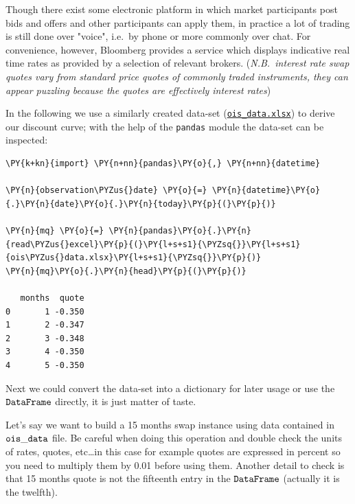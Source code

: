 Though there exist some electronic platform in which market participants post bids and offers and other participants can apply them, in practice a lot of trading is still done over "voice", i.e.~by phone or more
commonly over chat. For convenience, however, Bloomberg provides a service which displays indicative real time rates as provided by a selection of relevant brokers. (\emph{N.B.~interest rate swap quotes vary from standard price quotes of commonly traded instruments, they can appear puzzling because the quotes are effectively interest rates})

In the following we use a similarly created data-set (\href{https://drive.google.com/file/d/1LCEDmheKqwPXFpJ25hFz32QI5im2UJO1/view?usp=sharing}{\texttt{ois\_data.xlsx}}) to derive our discount curve; with the help of the \texttt{pandas} module the data-set can be inspected:

\begin{tcolorbox}[breakable, size=fbox, boxrule=1pt, pad at break*=1mm,colback=cellbackground, colframe=cellborder]
\begin{Verbatim}[commandchars=\\\{\}]
\PY{k+kn}{import} \PY{n+nn}{pandas}\PY{o}{,} \PY{n+nn}{datetime}

\PY{n}{observation\PYZus{}date} \PY{o}{=} \PY{n}{datetime}\PY{o}{.}\PY{n}{date}\PY{o}{.}\PY{n}{today}\PY{p}{(}\PY{p}{)}

\PY{n}{mq} \PY{o}{=} \PY{n}{pandas}\PY{o}{.}\PY{n}{read\PYZus{}excel}\PY{p}{(}\PY{l+s+s1}{\PYZsq{}}\PY{l+s+s1}{ois\PYZus{}data.xlsx}\PY{l+s+s1}{\PYZsq{}}\PY{p}{)}
\PY{n}{mq}\PY{o}{.}\PY{n}{head}\PY{p}{(}\PY{p}{)}

   months  quote
0       1 -0.350
1       2 -0.347
2       3 -0.348
3       4 -0.350
4       5 -0.350
\end{Verbatim}
\end{tcolorbox}

Next we could convert the data-set into a dictionary for later usage or
use the \(\tt{DataFrame}\) directly, it is just matter of taste.

Let's say we want to build a 15 months swap instance using data
contained in \(\tt{ois\_data}\) file. Be careful when doing this
operation and double check the units of rates, quotes, etc\ldots{}in
this case for example quotes are expressed in percent so you need to
multiply them by 0.01 before using them. Another detail to check is that
15 months quote is not the fifteenth entry in the \(\tt{DataFrame}\)
(actually it is the twelfth).

